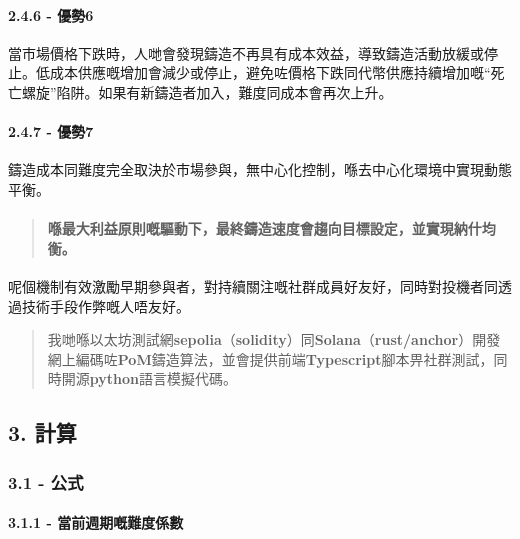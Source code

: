\documentclass[
]{article}
\begin{document}
\paragraph{2.4.6 - 優勢6}\label{ux512aux52e26}

當市場價格下跌時，人哋會發現鑄造不再具有成本效益，導致鑄造活動放緩或停止。低成本供應嘅增加會減少或停止，避免咗價格下跌同代幣供應持續增加嘅``死亡螺旋''陷阱。如果有新鑄造者加入，難度同成本會再次上升。

\paragraph{2.4.7 - 優勢7}\label{ux512aux52e27}

鑄造成本同難度完全取決於市場參與，無中心化控制，喺去中心化環境中實現動態平衡。

\begin{quote}
\mbox{}%
\paragraph{\texorpdfstring{\textbf{喺最大利益原則嘅驅動下，最終鑄造速度會趨向目標設定，並實現納什均衡}。}{喺最大利益原則嘅驅動下，最終鑄造速度會趨向目標設定，並實現納什均衡。}}\label{ux55baux6700ux5927ux5229ux76caux539fux5247ux5605ux9a45ux52d5ux4e0bux6700ux7d42ux9444ux9020ux901fux5ea6ux6703ux8da8ux5411ux76eeux6a19ux8a2dux5b9aux4e26ux5be6ux73feux7d0dux4ec0ux5747ux8861}
\end{quote}

呢個機制有效激勵早期參與者，對持續關注嘅社群成員好友好，同時對投機者同透過技術手段作弊嘅人唔友好。

\begin{quote}
我哋喺以太坊測試網\textbf{sepolia}（\textbf{solidity}）同\textbf{Solana}（\textbf{rust/anchor}）開發網上編碼咗\textbf{PoM}鑄造算法，並會提供前端\textbf{Typescript}腳本畀社群測試，同時開源\textbf{python}語言模擬代碼。
\end{quote}

\subsection{3. 計算}\label{ux8a08ux7b97}

\subsubsection{3.1 - 公式}\label{ux516cux5f0f}

\paragraph{3.1.1 -
當前週期嘅難度係數}\label{ux7576ux524dux9031ux671fux5605ux96e3ux5ea6ux4fc2ux6578}
\end{document}
